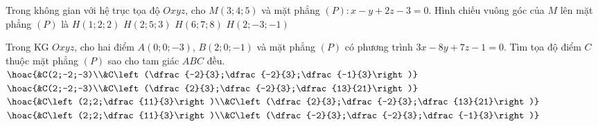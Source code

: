 \begin{ex}%
	Trong không gian với hệ trục tọa độ $Oxyz$, cho $M (3;4;5)$ và mặt phẳng $(P): x-y+2z-3=0$. Hình chiếu vuông góc của $M$ lên mặt phẳng $(P)$ là
	\choice 
	{$H(1;2;2)$}
	{\True $H(2;5;3)$}
	{$H(6;7;8)$}
	{$H(2;-3;-1)$}
\end{ex}
\begin{ex}%
	Trong KG $Oxyz$, cho hai điểm $A(0;0;-3)$, $B(2;0;-1)$ và mặt phẳng $(P)$ có phương trình $3x-8y+7z-1=0$. Tìm tọa độ điểm $C$ thuộc mặt phẳng $(P)$ sao cho tam giác $ABC$ đều.
	\choice
	{\True $\hoac{&C(2;-2;-3)\\&C\left(\dfrac{-2}{3};\dfrac{-2}{3};\dfrac{-1}{3}\right)}$}
	{$\hoac{&C(2;-2;-3)\\&C\left(\dfrac{2}{3};\dfrac{-2}{3};\dfrac{13}{21}\right)}$}
	{$\hoac{&C\left(2;2;\dfrac{11}{3}\right)\\&C\left(\dfrac{2}{3};\dfrac{-2}{3};\dfrac{13}{21}\right)}$}
	{$\hoac{&C\left(2;2;\dfrac{11}{3}\right)\\&C\left(\dfrac{-2}{3};\dfrac{-2}{3};\dfrac{-1}{3}\right)}$}
\end{ex}

